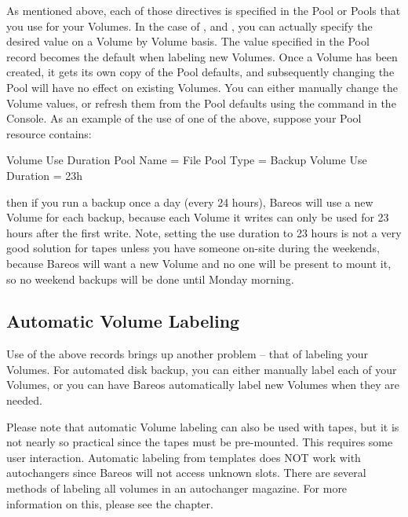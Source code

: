 As mentioned above, each of those directives is specified in the Pool or
Pools that you use for your Volumes. In the case of ,
 and ,
you can actually
specify the desired value on a Volume by Volume basis. The value specified in
the Pool record becomes the default when labeling new Volumes. Once a Volume
has been created, it gets its own copy of the Pool defaults, and subsequently
changing the Pool will have no effect on existing Volumes. You can either
manually change the Volume values, or refresh them from the Pool defaults using
the  command in the Console. As an example
of the use of one of the above, suppose your Pool resource contains:

\begin{bconfig}{Volume Use Duration}
Pool {
  Name = File
  Pool Type = Backup
  Volume Use Duration = 23h
}
\end{bconfig}

then if you run a backup once a day (every 24 hours), Bareos will use a new
Volume for each backup, because each Volume it writes can only be used for 23 hours
after the first write. Note, setting the use duration to 23 hours is not a very
good solution for tapes unless you have someone on-site during the weekends,
because Bareos will want a new Volume and no one will be present to mount it,
so no weekend backups will be done until Monday morning.

\subsection{Automatic Volume Labeling}
\label{AutomaticLabeling}

Use of the above records brings up another problem -- that of labeling your
Volumes. For automated disk backup, you can either manually label each of your
Volumes, or you can have Bareos automatically label new Volumes when they are
needed.

Please note that automatic Volume labeling can also be used with tapes, but
it is not nearly so practical since the tapes must be pre-mounted.  This
requires some user interaction.  Automatic labeling from templates does NOT
work with autochangers since Bareos will not access unknown slots.  There
are several methods of labeling all volumes in an autochanger magazine.
For more information on this, please see the  chapter.

